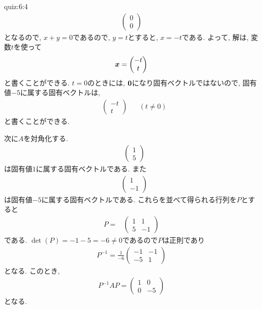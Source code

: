 \begin{answerof}{quiz:6:4}
\begin{align*}
      \begin{pmatrix}0\\0\end{pmatrix}
  \end{align*}
  となるので,
   $x+y=0$であるので,
  $y=t$とすると, $x=-t$である.
  よって, 解は, 変数$t$を使って
  \begin{align*}
    \boldsymbol{x}=\begin{pmatrix}-t\\t\end{pmatrix} 
  \end{align*}
  と書くことができる.
  $t=0$のときには, $\boldsymbol{0}$になり固有ベクトルではないので,
  固有値$-5$に属する固有ベクトルは,
  \begin{align*}
    &\begin{pmatrix}-t\\t\end{pmatrix}
       &&(t\neq 0)
  \end{align*}
  と書くことができる.

  
  次に$A$を対角化する.
  \begin{align*}
    &\begin{pmatrix}1\\5\end{pmatrix}
  \end{align*}
  は固有値$1$に属する固有ベクトルである.
  また
  \begin{align*}
    &\begin{pmatrix}1\\-1\end{pmatrix}
  \end{align*}
  は固有値$-5$に属する固有ベクトルである.
  これらを並べて得られる行列を$P$とすると
  \begin{align*}
    P=&\begin{pmatrix}1&1\\5&-1\end{pmatrix}
  \end{align*}
  である.
  $\det(P)=-1-5=-6\neq 0$であるので$P$は正則であり
  \begin{align*}
    P^{-1}=\frac{1}{-6}\begin{pmatrix}-1&-1\\-5&1\end{pmatrix}
  \end{align*}
  となる.
  このとき,
  \begin{align*}
    P^{-1}AP=\begin{pmatrix}1&0\\0&-5\end{pmatrix}
  \end{align*}
  となる.



\end{answerof}
